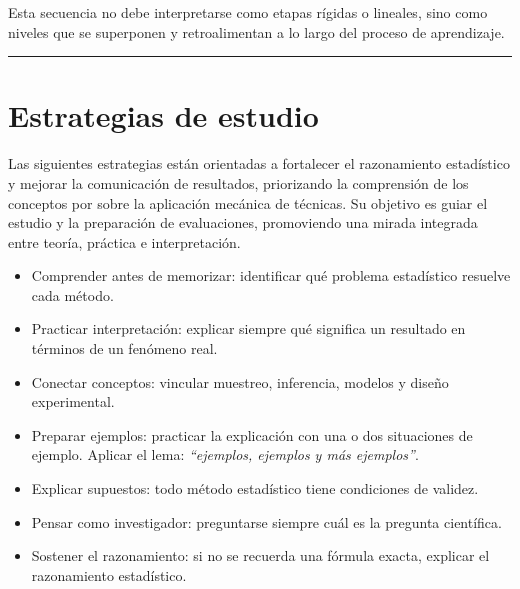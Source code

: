 \documentclass[
  spanish,
  letterpaper,
  DIV=11,
  numbers=noendperiod]{scrreprt}
\providecommand{\tightlist}{%
  \setlength{\itemsep}{0pt}\setlength{\parskip}{0pt}}
\begin{document}
Esta secuencia no debe interpretarse como etapas rígidas o lineales,
sino como niveles que se superponen y retroalimentan a lo largo del
proceso de aprendizaje.

\begin{center}\rule{0.5\linewidth}{0.5pt}\end{center}

\section{Estrategias de estudio}\label{estrategias-de-estudio}

Las siguientes estrategias están orientadas a fortalecer el razonamiento
estadístico y mejorar la comunicación de resultados, priorizando la
comprensión de los conceptos por sobre la aplicación mecánica de
técnicas. Su objetivo es guiar el estudio y la preparación de
evaluaciones, promoviendo una mirada integrada entre teoría, práctica e
interpretación.

\begin{itemize}
\tightlist
\item
  Comprender antes de memorizar: identificar qué problema estadístico
  resuelve cada método.
\item
  Practicar interpretación: explicar siempre qué significa un resultado
  en términos de un fenómeno real.
\item
  Conectar conceptos: vincular muestreo, inferencia, modelos y diseño
  experimental.
\item
  Preparar ejemplos: practicar la explicación con una o dos situaciones
  de ejemplo. Aplicar el lema: \emph{``ejemplos, ejemplos y más
  ejemplos''}.
\item
  Explicar supuestos: todo método estadístico tiene condiciones de
  validez.
\item
  Pensar como investigador: preguntarse siempre cuál es la pregunta
  científica.
\item
  Sostener el razonamiento: si no se recuerda una fórmula exacta,
  explicar el razonamiento estadístico.
\end{itemize}

~
\end{document}
